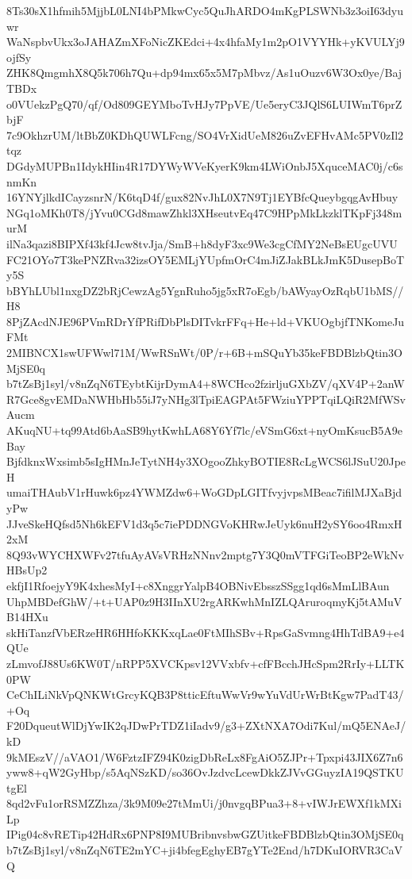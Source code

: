 8Ts30sX1hfmih5MjjbL0LNI4bPMkwCyc5QuJhARDO4mKgPLSWNb3z3oiI63dyuwr
WaNspbvUkx3oJAHAZmXFoNicZKEdci+4x4hfaMy1m2pO1VYYHk+yKVULYj9ojfSy
ZHK8QmgmhX8Q5k706h7Qu+dp94mx65x5M7pMbvz/As1uOuzv6W3Ox0ye/BajTBDx
o0VUekzPgQ70/qf/Od809GEYMboTvHJy7PpVE/Ue5eryC3JQlS6LUIWmT6prZbjF
7c9OkhzrUM/ltBbZ0KDhQUWLFcng/SO4VrXidUeM826uZvEFHvAMc5PV0zIl2tqz
DGdyMUPBn1IdykHIin4R17DYWyWVeKyerK9km4LWiOnbJ5XquceMAC0j/c6snmKn
16YNYjlkdICayzsnrN/K6tqD4f/gux82NvJhL0X7N9Tj1EYBfcQueybgqgAvHbuy
NGq1oMKh0T8/jYvu0CGd8mawZhkl3XHseutvEq47C9HPpMkLkzklTKpFj348murM
ilNa3qazi8BIPXf43kf4Jcw8tvJja/SmB+h8dyF3xc9We3cgCfMY2NeBsEUgcUVU
FC21OYo7T3kePNZRva32izsOY5EMLjYUpfmOrC4mJiZJakBLkJmK5DusepBoTy5S
bBYhLUbl1nxgDZ2bRjCewzAg5YgnRuho5jg5xR7oEgb/bAWyayOzRqbU1bMS//H8
8PjZAcdNJE96PVmRDrYfPRifDbPlsDITvkrFFq+He+ld+VKUOgbjfTNKomeJuFMt
2MIBNCX1swUFWwl71M/WwRSnWt/0P/r+6B+mSQuYb35keFBDBlzbQtin3OMjSE0q
b7tZsBj1syl/v8nZqN6TEybtKijrDymA4+8WCHco2fzirljuGXbZV/qXV4P+2anW
R7Gce8gvEMDaNWHbHb55iJ7yNHg3lTpiEAGPAt5FWziuYPPTqiLQiR2MfWSvAucm
AKuqNU+tq99Atd6bAaSB9hytKwhLA68Y6Yf7lc/eVSmG6xt+nyOmKsucB5A9eBay
BjfdknxWxsimb5sIgHMnJeTytNH4y3XOgooZhkyBOTIE8RcLgWCS6lJSuU20JpeH
umaiTHAubV1rHuwk6pz4YWMZdw6+WoGDpLGITfvyjvpsMBeac7ifilMJXaBjdyPw
JJveSkeHQfsd5Nh6kEFV1d3q5c7iePDDNGVoKHRwJeUyk6nuH2ySY6oo4RmxH2xM
8Q93vWYCHXWFv27tfuAyAVsVRHzNNnv2mptg7Y3Q0mVTFGiTeoBP2eWkNvHBsUp2
ekfjI1RfoejyY9K4xhesMyI+c8XnggrYalpB4OBNivEbsszSSgg1qd6sMmLlBAun
UhpMBDefGhW/+t+UAP0z9H3IInXU2rgARKwhMnIZLQAruroqmyKj5tAMuVB14HXu
skHiTanzfVbERzeHR6HHfoKKKxqLae0FtMIhSBv+RpsGaSvmng4HhTdBA9+e4QUe
zLmvofJ88Us6KW0T/nRPP5XVCKpsv12VVxbfv+cfFBcchJHcSpm2RrIy+LLTK0PW
CeChILiNkVpQNKWtGrcyKQB3P8tticEftuWwVr9wYuVdUrWrBtKgw7PadT43/+Oq
F20DqueutWlDjYwIK2qJDwPrTDZ1iIadv9/g3+ZXtNXA7Odi7Kul/mQ5ENAeJ/kD
9kMEszV//aVAO1/W6FztzIFZ94K0zigDbReLx8FgAiO5ZJPr+Tpxpi43JIX6Z7n6
yww8+qW2GyHbp/s5AqNSzKD/so36OvJzdvcLcewDkkZJVvGGuyzIA19QSTKUtgEl
8qd2vFu1orRSMZZhza/3k9M09e27tMmUi/j0nvgqBPua3+8+vIWJrEWXf1kMXiLp
IPig04c8vRETip42HdRx6PNP8I9MUBribnvsbwGZUitkeFBDBlzbQtin3OMjSE0q
b7tZsBj1syl/v8nZqN6TE2mYC+ji4bfegEghyEB7gYTe2End/h7DKuIORVR3CaVQ
